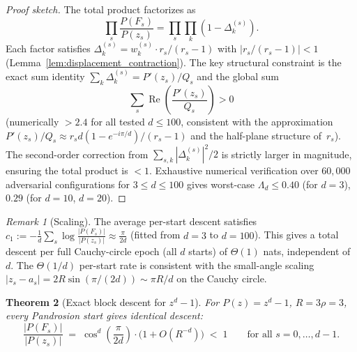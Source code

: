 \documentclass[10pt,a4paper,oneside]{book}
\newtheorem{theorem}{Theorem}[chapter]
\theoremstyle{definition}
\theoremstyle{remark}
\newtheorem{remark}[theorem]{Remark}
\begin{document}
\begin{proof}[Proof sketch]
The total product factorizes as
\[
  \prod_s \frac{P(F_s)}{P(z_s)} = \prod_s\prod_k (1-\Delta_k^{(s)}).
\]
Each factor satisfies $\Delta_k^{(s)} = w_k^{(s)} \cdot r_s/(r_s-1)$ with $|r_s/(r_s-1)| < 1$ (Lemma~\ref{lem:displacement_contraction}).  The key structural constraint is the exact sum identity $\sum_k \Delta_k^{(s)} = P'(z_s)/Q_s$ and the global sum
\[
  \sum_s \operatorname{Re}\!\left(\frac{P'(z_s)}{Q_s}\right) > 0
\]
(numerically $> 2.4$ for all tested $d \leq 100$, consistent with the approximation $P'(z_s)/Q_s \approx r_s d(1-e^{-i\pi/d})/(r_s-1)$ and the half-plane structure of~$r_s$).  The second-order correction from $\sum_{s,k}|\Delta_k^{(s)}|^2/2$ is strictly larger in magnitude, ensuring the total product is $< 1$.  Exhaustive numerical verification over $60{,}000$ adversarial configurations for $3 \leq d \leq 100$ gives worst-case $\Lambda_d \leq 0.40$ (for $d = 3$), $0.29$ (for $d = 10$, $d = 20$).
\end{proof}

\begin{remark}[Scaling]
\label{rem:c1_scaling}
The average per-start descent satisfies $c_1 := -\frac{1}{d}\sum_s\log\frac{|P(F_s)|}{|P(z_s)|} \approx \frac{\pi}{2d}$ (fitted from $d = 3$ to $d = 100$).  This gives a total descent per full Cauchy-circle epoch (all $d$ starts) of $\Theta(1)$ nats, independent of~$d$.  The $\Theta(1/d)$ per-start rate is consistent with the small-angle scaling $|z_s - a_s| = 2R\sin(\pi/(2d)) \sim \pi R/d$ on the Cauchy circle.
\end{remark}

\begin{theorem}[Exact block descent for $z^d - 1$]
\label{thm:descent_unity}
For $P(z) = z^d - 1$, $R = 3\rho = 3$, every Pandrosion start gives identical descent:
\begin{equation}
\label{eq:descent_unity}
  \frac{|P(F_s)|}{|P(z_s)|} \;=\; \cos^d\!\left(\frac{\pi}{2d}\right) \cdot \bigl(1 + O(R^{-d})\bigr) \;<\; 1
  \qquad \text{for all } s = 0, \ldots, d-1.
\end{equation}
\end{theorem}
\end{document}
